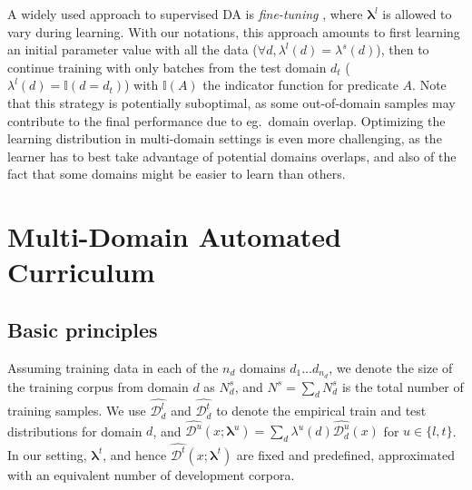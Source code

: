 \documentclass[11pt]{article}
\newcommand{\fyDone}[1]{\done[FY]\Todo[FY:]{\textcolor{orange}{#1}}}
\newcommand{\revision}[1]{\textcolor{red}{#1}}
\newcommand{\system}[1]{\texttt{{#1}}}
\newcommand{\vlambda}{\ensuremath{\boldsymbol\lambda}\xspace} %
\newcommand{\indic}[1]{\ensuremath{\mathbb{I}(#1)}}
\begin{document}
A widely used approach to supervised DA is \emph{fine-tuning} \citep{Luong15stanford,Freitag16fast}, where $\vlambda^{l}$ is allowed to vary during learning. With our notations, this approach amounts to first learning an initial parameter value with all the data ($\forall d, \lambda^{l}(d) = \lambda^{s}(d)$), then to continue training with only batches from the test domain $d_t$ ($\lambda^{l}(d) = \indic{d = d_t}$) with $\indic{A}$ the indicator function for predicate $A$. Note that this strategy is potentially suboptimal, as some out-of-domain samples may contribute to the final performance due to eg.\ domain overlap. Optimizing the learning distribution in multi-domain settings is even more challenging, as the learner has to best take advantage of potential domains overlaps, and also of the fact that some domains might be easier to learn than others.\fyDone{How to measure this?}

\section{Multi-Domain Automated Curriculum } \label{sec:mdac}
\subsection{Basic principles}
Assuming training data in each of the $n_d$ domains $d_1 \dots d_{n_d}$, we denote the size of the training corpus from domain $d$ as $N^{s}_d$, and $N^{s} = \sum_d N^{s}_d$ is the total number of training samples. We use $\widehat{\mathcal{D}^l_d}$ and $\widehat{\mathcal{D}^t_d}$ to denote the empirical train and test distributions for domain $d$, and $\widehat{\mathcal{D}^{u}}(x;\vlambda^{u}) = \sum_{d} \lambda^{u}(d) \widehat{\mathcal{D}^{u}_d}(x)$ for $u\in\{l,t\}$. In our setting,  $\vlambda^t$, and hence $\widehat{\mathcal{D}^t}(x;\vlambda^t)$ are fixed and predefined, approximated with an equivalent number of development corpora. 
\end{document}
